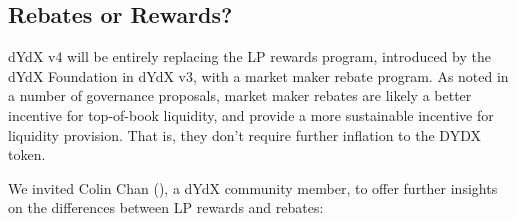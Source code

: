         \subsection{Rebates or Rewards?}

            dYdX v4 will be entirely replacing the LP rewards program, introduced by the dYdX Foundation in dYdX v3, with a market maker rebate program. As noted in a number of governance proposals, market maker rebates are likely a better incentive for top-of-book liquidity, and provide a more sustainable incentive for liquidity provision. That is, they don't require further inflation to the DYDX token.
            
            We invited Colin Chan (), a dYdX community member, to offer further insights on the differences between LP rewards and rebates:

